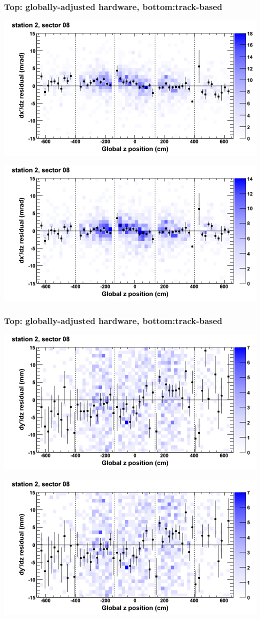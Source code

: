 \documentclass[compress]{beamer}
\begin{document}
\begin{frame}
\frametitle{Top: globally-adjusted hardware, bottom:track-based}
\includegraphics[width=0.7\linewidth]{NOV4_mapplots_HW/DTvsz_st2sec08_dxdz.png}

\includegraphics[width=0.7\linewidth]{NOV4_mapplots/DTvsz_st2sec08_dxdz.png}
\end{frame}

\begin{frame}
\frametitle{Top: globally-adjusted hardware, bottom:track-based}
\includegraphics[width=0.7\linewidth]{NOV4_mapplots_HW/DTvsz_st2sec08_dydz.png}

\includegraphics[width=0.7\linewidth]{NOV4_mapplots/DTvsz_st2sec08_dydz.png}
\end{frame}
\end{document}
